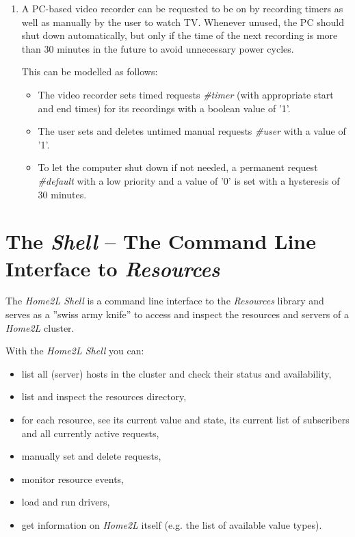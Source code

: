 \documentclass[12pt,english,parskip=half,headheight=19pt]{scrreprt}
\makeatletter
\newcommand{\labeltool}[1]{\index{#1@\texttt{#1} (tool)} \label{tool:#1}}
\makeatother
\begin{document}
{\begin{enumerate}
  \item
    A PC-based video recorder can be requested to be on by recording timers as well as
    manually by the user to watch TV. Whenever unused, the PC should shut
    down automatically, but only if the time of the next recording is more
    than 30 minutes in the future to avoid unnecessary power cycles.

    This can be modelled as follows:
    \begin{itemize}
    \item
      The video recorder sets timed requests \textit{\#timer}
      (with appropriate start and end times) for its recordings with a boolean
      value of '1'.
    \item
      The user sets and deletes untimed manual requests \textit{\#user} with
      a value of '1'.
    \item
      To let the computer shut down if not needed, a permanent request
      \textit{\#default} with a low priority and a value of '0' is set with a
      hysteresis of 30 minutes.
    \end{itemize}

  \end{enumerate}
}





%
\clearpage
\section{The \textit{Shell} -- The Command Line Interface to \textit{Resources}}
\label{sec:resources-shell} \labeltool{home2l-shell}
%


The \textit{Home2L Shell} is a command line interface to the \textit{Resources} library and serves as a ''swiss army knife'' to access and inspect the resources and servers of a \textit{Home2L} cluster.

With the \textit{Home2L Shell} you can:
\begin{itemize}
  \item list all (server) hosts in the cluster and check their status and availability,
  \item list and inspect the resources directory,
  \item for each resource, see its current value and state, its current list of subscribers and
  all currently active requests,
  \item manually set and delete requests,
  \item monitor resource events,
  \item load and run drivers,
  \item get information on \textit{Home2L} itself (e.g. the list of available value types).
\end{itemize}
\end{document}

